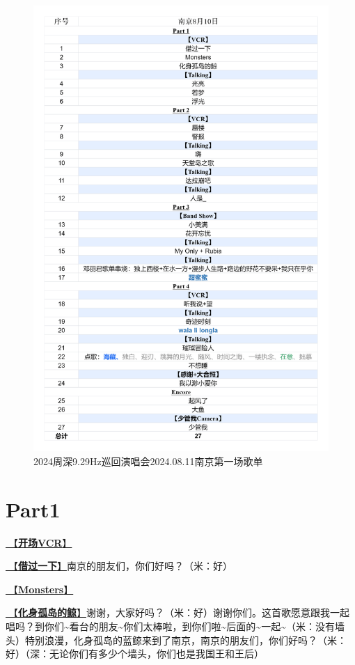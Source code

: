 \documentclass[]{ctexbook}
\begin{document}
\begin{figure}

{\centering \includegraphics[width=320pt]{img/playlists/playlists-nanjing-20240810} 

}

\caption{2024周深9.29Hz巡回演唱会2024.08.11南京第一场歌单}\label{fig:unnamed-chunk-64}
\end{figure}

\newpage

\section{Part1}\label{nanjing-20240810-part1}

\hyperref[opening-vcr]{🎥【\textbf{开场VCR}】}

\hyperref[I-will-go-my-way]{🎵【\textbf{借过一下}】}南京的朋友们，你们好吗？（米：好）

\hyperref[Monsters]{🎵【\textbf{Monsters}】}

\hyperref[hua-shen-gu-dao-de-jing]{🎵【\textbf{化身孤岛的鲸}】}谢谢，大家好吗？（米：好）谢谢你们。这首歌愿意跟我一起唱吗？到你们\textasciitilde 看台的朋友\textasciitilde 你们太棒啦，到你们啦\textasciitilde 后面的\textasciitilde 一起\textasciitilde（米：没有墙头）特别浪漫，化身孤岛的蓝鲸来到了南京，南京的朋友们，你们好吗？（米：好）（深：无论你们有多少个墙头，你们也是我国王和王后）
\end{document}
